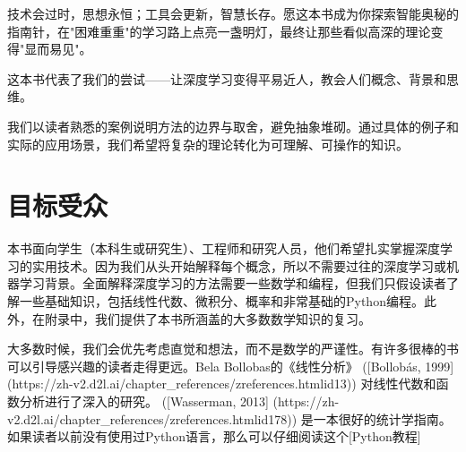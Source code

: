 技术会过时，思想永恒；工具会更新，智慧长存。愿这本书成为你探索智能奥秘的指南针，在"困难重重"的学习路上点亮一盏明灯，最终让那些看似高深的理论变得"显而易见"。

这本书代表了我们的尝试——让深度学习变得平易近人，教会人们概念、背景和思维。

我们以读者熟悉的案例说明方法的边界与取舍，避免抽象堆砌。通过具体的例子和实际的应用场景，我们希望将复杂的理论转化为可理解、可操作的知识。

\section{目标受众}

本书面向学生（本科生或研究生）、工程师和研究人员，他们希望扎实掌握深度学习的实用技术。因为我们从头开始解释每个概念，所以不需要过往的深度学习或机器学习背景。全面解释深度学习的方法需要一些数学和编程，但我们只假设读者了解一些基础知识，包括线性代数、微积分、概率和非常基础的Python编程。此外，在附录中，我们提供了本书所涵盖的大多数数学知识的复习。

大多数时候，我们会优先考虑直觉和想法，而不是数学的严谨性。有许多很棒的书可以引导感兴趣的读者走得更远。Bela Bollobas的《线性分析》 ([Bollobás, 1999](https://zh-v2.d2l.ai/chapter\_references/zreferences.htmlid13)) 
对线性代数和函数分析进行了深入的研究。 ([Wasserman, 2013]
(https://zh-v2.d2l.ai/chapter\_references/zreferences.htmlid178))
是一本很好的统计学指南。如果读者以前没有使用过Python语言，那么可以仔细阅读这个[Python教程]

\newpage